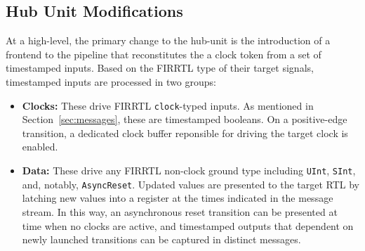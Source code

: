 \subsection{Hub Unit Modifications}\label{sec:pdes-hub-modifications}

At a high-level, the primary change to the hub-unit is the introduction of a
frontend to the pipeline that reconstitutes the a clock token from a set of
timestamped inputs. Based on the FIRRTL type of their target signals, timestamped inputs are processed in two groups:

\begin{itemize}

\item \textbf{Clocks:} These drive FIRRTL \texttt{clock}-typed inputs. As mentioned in Section~\ref{sec:messages},
these are timestamped booleans. On a positive-edge transition, a dedicated clock buffer
reponsible for driving the target clock is enabled.

\item \textbf{Data:} These drive any FIRRTL non-clock ground type including
    \texttt{UInt}, \texttt{SInt}, and, notably, \texttt{AsyncReset}. Updated
        values are presented to the target RTL by latching new values into a
        register at the times indicated in the message stream. In this way, an
        asynchronous reset transition can be presented at time when no clocks
        are active, and timestamped outputs that dependent on
        newly launched transitions can be captured in distinct messages.
\end{itemize}

